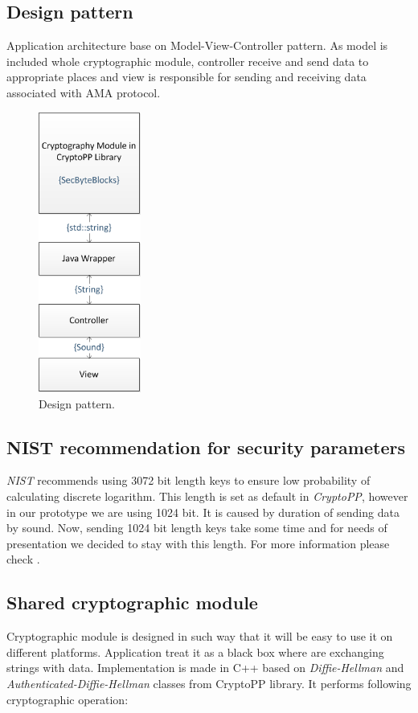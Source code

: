 \documentclass[11pt,titlepage]{article}
\theoremstyle{plain}
\begin{document}
\subsection{Design pattern}

Application architecture base on Model-View-Controller pattern. As model is included whole cryptographic module, controller receive and send data to appropriate places and view is responsible for sending and receiving data associated with AMA protocol. 

\begin{figure}[H]
	\centering
	\includegraphics[width=0.3\textwidth]{img/Design}
	\caption{Design pattern.}
\end{figure}

\subsection{NIST recommendation for security parameters}

\textit{NIST} recommends using 3072 bit length keys to ensure low probability of calculating discrete logarithm. This length is set as default in \textit{CryptoPP}, however in our prototype we are using 1024 bit. It is caused by duration of sending data by sound. Now, sending 1024 bit length keys take some time and for needs of presentation we decided to stay with this length. For more information please check \cite{NIST}.

\subsection{Shared cryptographic module}
Cryptographic module is designed in such way that it will be easy to use it on different platforms. Application treat it as a black box where are exchanging strings with data. Implementation is made in C++ based on \textit{Diffie-Hellman} and \textit{Authenticated-Diffie-Hellman} classes from CryptoPP library. It performs following cryptographic operation:
\end{document}

